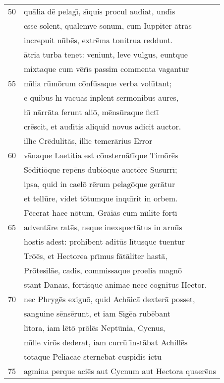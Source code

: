 \documentclass[paper=6in:9in,pagesize=pdftex,
               headinclude=on,footinclude=on,12pt]{scrbook}
\begin{document}
\begin{longtable}[p]{ r l }
50 & qu\=alia d\=e pelag\={\i}, s\={\i}quis procul audiat, und\={\i}s\\ 
 & esse solent, qu\=alemve sonum, cum Iuppiter \=atr\=as\\ 
 & increpuit n\=ub\=es, extr\=ema tonitrua reddunt.\\ 
 & \=atria turba tenet: veniunt, leve vulgus, euntque\\ 
 & mixtaque cum v\=er\={\i}s passim commenta vagantur\\ 
55 & m\={\i}lia r\=um\=orum c\=onf\=usaque verba vol\=utant;\\ 
 & \=e quibus h\={\i} vacu\=as inplent serm\=onibus aur\=es,\\ 
 & h\={\i} n\=arr\=ata ferunt ali\=o, m\=ens\=uraque fict\={\i}\\ 
 & cr\=escit, et aud\={\i}tis aliquid novus adicit auctor.\\ 
 & ill\={\i}c Cr\=edulit\=as, ill\={\i}c temer\=arius Error\\ 
60 & v\=anaque Laetitia est c\=onstern\=at\={\i}que Tim\=or\=es\\ 
 & S\=editi\=oque rep\=ens dubi\=oque auct\=ore Susurr\={\i};\\ 
 & ipsa, quid in cael\=o r\=erum pelag\=oque ger\=atur\\ 
 & et tell\=ure, videt t\=otumque inqu\={\i}rit in orbem.\\ 
 & \indent F\=ecerat haec n\=otum, Gr\=ai\=as cum m\={\i}lite fort\={\i}\\ 
65 & advent\=are rat\=es, neque inexspect\=atus in arm\={\i}s\\ 
 & hostis adest: prohibent adit\=us l\={\i}tusque tuentur\\ 
 & Tr\=o\=es, et Hectorea pr\={\i}mus f\=at\=aliter hast\=a,\\ 
 & Pr\=otesil\=ae, cadis, commissaque proelia magn\=o\\ 
 & stant Dana\={\i}s, fortisque animae nece cognitus Hector.\\ 
70 & nec Phryg\=es exigu\=o, quid Ach\=aic\=a dexter\=a posset,\\ 
 & sanguine s\=ens\=erunt, et iam S\={\i}g\=ea rub\=ebant\\ 
 & l\={\i}tora, iam l\=et\=o pr\=ol\=es Nept\=unia, Cycnus,\\ 
 & m\={\i}lle vir\=os dederat, iam curr\=u \={\i}nst\=abat Achill\=es\\ 
 & t\=otaque P\=eliacae stern\=ebat cuspidis ict\=u\\ 
75 & agmina perque aci\=es aut Cycnum aut Hectora quaer\=ens\\ 

\end{longtable}
\end{document}
